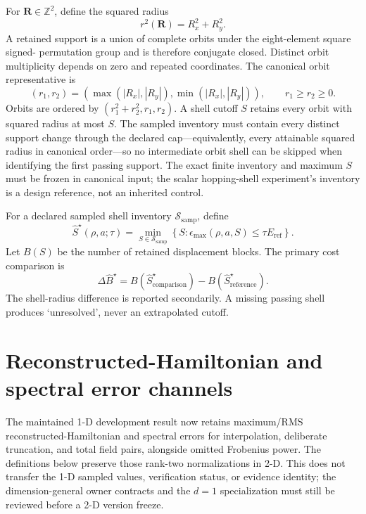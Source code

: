 \documentclass[11pt]{article}
\newcommand{\Z}{\mathbb Z}
\begin{document}
For $\mathbf R\in\Z^2$, define the squared radius
\begin{equation}
 r^2(\mathbf R)=R_x^2+R_y^2.
\end{equation}
A retained support is a union of complete orbits under the eight-element square signed-
permutation group and is therefore conjugate closed. Distinct orbit multiplicity depends
on zero and repeated coordinates. The canonical orbit representative is
\begin{equation}
 (r_1,r_2)=\left(\max(|R_x|,|R_y|),\min(|R_x|,|R_y|)\right),
 \qquad r_1\ge r_2\ge0.
\end{equation}
Orbits are ordered by $(r_1^2+r_2^2,r_1,r_2)$. A shell cutoff $S$ retains every orbit
with squared radius at most $S$. The sampled inventory must contain every distinct
support change through the declared cap---equivalently, every attainable squared radius
in canonical order---so no intermediate orbit shell can be skipped when identifying the
first passing support. The exact finite inventory and maximum $S$ must be frozen in
canonical input; the scalar hopping-shell experiment's inventory is a design reference,
not an inherited control.

For a declared sampled shell inventory $\mathcal S_{\mathrm{samp}}$, define
\begin{equation}
 \widehat S^\star(\rho,a;\tau)=
 \min_{S\in\mathcal S_{\mathrm{samp}}}
 \left\{S:\epsilon_{\max}(\rho,a,S)\le\tau E_{\mathrm{ref}}\right\}.
\end{equation}
Let $B(S)$ be the number of retained displacement blocks. The primary cost comparison is
\begin{equation}
 \Delta\widehat B^\star
 =B\!\left(\widehat S_{\mathrm{comparison}}^\star\right)
  -B\!\left(\widehat S_{\mathrm{reference}}^\star\right).
 \label{eq:block-inflation}
\end{equation}
The shell-radius difference is reported secondarily. A missing passing shell produces
`unresolved', never an extrapolated cutoff.

\section{Reconstructed-Hamiltonian and spectral error channels}

The maintained 1-D development result now retains maximum/RMS reconstructed-Hamiltonian
and spectral errors for interpolation, deliberate truncation, and total field pairs,
alongside omitted Frobenius power. The definitions below preserve those rank-two
normalizations in 2-D. This does not transfer the 1-D sampled values, verification
status, or evidence identity; the dimension-general owner contracts and the $d=1$
specialization must still be reviewed before a 2-D version freeze.
\end{document}
